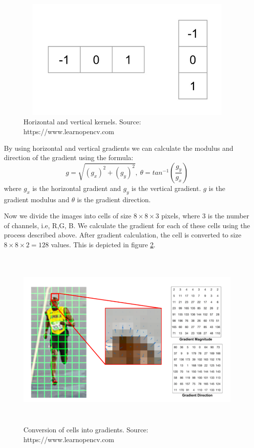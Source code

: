 \begin{figure}[!htbp]
\centerline{\includegraphics[height=60mm,width=120mm]{img/fig9.png}}
\caption{Horizontal and vertical kernels. Source: https://www.learnopencv.com}
\label{fig9}
\end{figure}

By using horizontal and vertical gradients we can calculate the modulus and direction of the gradient using the formula:
$$g=\sqrt{(g_x)^2+(g_y)^2},\ \theta=tan^{-1}(\frac{g_y}{g_x})$$ where $g_x$ is the horizontal gradient and $g_y$ is the vertical gradient. $g$ is the gradient modulus and $\theta$ is the gradient direction.

\par Now we divide the images into cells of size $8\times 8\times 3$ pixels, where $3$ is the number of channels, i.e, R,G, B. We calculate the gradient for each of these cells using the process described above. After gradient calculation, the cell is converted to size $8\times 8\times 2=128$ values. This is depicted in figure \ref{fig10}. 

\begin{figure}[!htbp]
\centerline{\includegraphics[height=90mm,width=150mm]{img/fig10.png}}
\caption{Conversion of cells into gradients. Source: https://www.learnopencv.com}
\label{fig10}
\end{figure}

